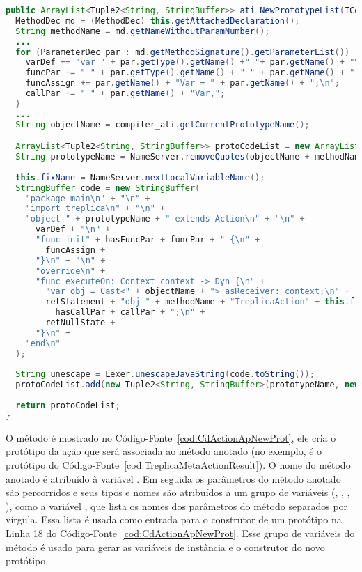 \begin{lstlisting}[language=Java, caption={Método que cria o protótipo da ação associada ao método anotado}, label={cod:CdActionApNewProt}, frame=TLBR, basicstyle=\linespread{0.8}\fontsize{9}{\baselineskip}\selectfont\ttfamily]
public ArrayList<Tuple2<String, StringBuffer>> ati_NewPrototypeList(ICompiler_ati compiler_ati) {
  MethodDec md = (MethodDec) this.getAttachedDeclaration();
  String methodName = md.getNameWithoutParamNumber();
  ...
  for (ParameterDec par : md.getMethodSignature().getParameterList()) {
    varDef += "var " + par.getType().getName() +" "+ par.getName() + "Var\n";
    funcPar += " " + par.getType().getName() + " " + par.getName() + ",";
    funcAssign += par.getName() + "Var = " + par.getName() + ";\n";
    callPar += " " + par.getName() + "Var,";
  }
  ...
  String objectName = compiler_ati.getCurrentPrototypeName();

  ArrayList<Tuple2<String, StringBuffer>> protoCodeList = new ArrayList<>();
  String prototypeName = NameServer.removeQuotes(objectName + methodName);
  
  this.fixName = NameServer.nextLocalVariableName();
  StringBuffer code = new StringBuffer( 
    "package main\n" + "\n" + 
    "import treplica\n" + "\n" + 
    "object " + prototypeName + " extends Action\n" + "\n" + 
      varDef + "\n" + 
      "func init" + hasFuncPar + funcPar + " {\n" + 
        funcAssign + 
      "}\n" + "\n" + 
      "override\n" + 
      "func executeOn: Context context -> Dyn {\n" + 
        "var obj = Cast<" + objectName + "> asReceiver: context;\n" + 
        retStatement + "obj " + methodName + "TreplicaAction" + this.fixName +
          hasCallPar + callPar + ";\n" + 
        retNullState + 
      "}\n" + 
    "end\n"
  );
  
  String unescape = Lexer.unescapeJavaString(code.toString());
  protoCodeList.add(new Tuple2<String, StringBuffer>(prototypeName, new StringBuffer(unescape)));
  
  return protoCodeList;
}
\end{lstlisting}

O método  é mostrado no Código-Fonte~\ref{cod:CdActionApNewProt}, ele cria o protótipo da ação que será associada ao método anotado (no exemplo, é o protótipo  do Código-Fonte~\ref{cod:TreplicaMetaActionResult}). O nome do método anotado é atribuído à variável . Em seguida os parâmetros do método anotado são percorridos e seus tipos e nomes são atribuídos a um grupo de variáveis (, , , ), como a variável , que lista os nomes dos parâmetros do método separados por vírgula. Essa lista é usada como entrada para o construtor de um protótipo na Linha 18 do Código-Fonte~\ref{cod:CdActionApNewProt}. Esse grupo de variáveis do método  é usado para gerar as variáveis de instância e o construtor do novo protótipo. 

